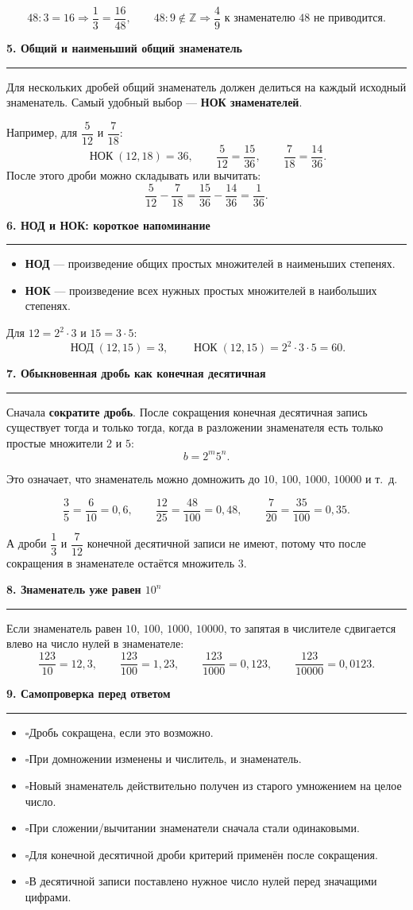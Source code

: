\documentclass[a4paper,12pt]{article}
\newcommand{\topic}[1]{%
  \vspace{0.55em}%
  {\large\bfseries\color{darkaccent}#1}\par
  \vspace{0.15em}\color{lightline}\rule{\linewidth}{0.6pt}\color{textgray}\vspace{0.25em}
}
\newcommand{\key}[1]{\textbf{\color{darkaccent}#1}}
\newcommand{\checkitem}{\(\square\)\;}
\newcommand{\nodop}{\mathop{\text{НОД}}\nolimits}
\newcommand{\nokop}{\mathop{\text{НОК}}\nolimits}
\begin{document}
\[
48:3=16 \Rightarrow \frac13=\frac{16}{48},
\qquad
48:9\notin\mathbb Z \Rightarrow \frac49\text{ к знаменателю }48\text{ не приводится}.
\]

\topic{5. Общий и наименьший общий знаменатель}
Для нескольких дробей общий знаменатель должен делиться на каждый исходный знаменатель. Самый удобный выбор --- \key{НОК знаменателей}.

Например, для \(\dfrac{5}{12}\) и \(\dfrac{7}{18}\):
\[
\nokop(12,18)=36,
\qquad
\frac{5}{12}=\frac{15}{36},
\qquad
\frac{7}{18}=\frac{14}{36}.
\]
После этого дроби можно складывать или вычитать:
\[
\frac{5}{12}-\frac{7}{18}=\frac{15}{36}-\frac{14}{36}=\frac1{36}.
\]

\topic{6. НОД и НОК: короткое напоминание}
\begin{itemize}
  \item \key{НОД} --- произведение общих простых множителей в наименьших степенях.
  \item \key{НОК} --- произведение всех нужных простых множителей в наибольших степенях.
\end{itemize}

Для \(12=2^2\cdot3\) и \(15=3\cdot5\):
\[
\nodop(12,15)=3,
\qquad
\nokop(12,15)=2^2\cdot3\cdot5=60.
\]

\topic{7. Обыкновенная дробь как конечная десятичная}
Сначала \key{сократите дробь}. После сокращения конечная десятичная запись существует тогда и только тогда, когда в разложении знаменателя есть только простые множители \(2\) и \(5\):
\[
b=2^m5^n.
\]

Это означает, что знаменатель можно домножить до \(10\), \(100\), \(1000\), \(10000\) и т.~д.

\[
\frac{3}{5}=\frac{6}{10}=0{,}6,
\qquad
\frac{12}{25}=\frac{48}{100}=0{,}48,
\qquad
\frac{7}{20}=\frac{35}{100}=0{,}35.
\]

А дроби \(\dfrac13\) и \(\dfrac7{12}\) конечной десятичной записи не имеют, потому что после сокращения в знаменателе остаётся множитель \(3\).

\topic{8. Знаменатель уже равен $10^n$}
Если знаменатель равен \(10\), \(100\), \(1000\), \(10000\), то запятая в числителе сдвигается влево на число нулей в знаменателе:
\[
\frac{123}{10}=12{,}3,\qquad
\frac{123}{100}=1{,}23,\qquad
\frac{123}{1000}=0{,}123,\qquad
\frac{123}{10000}=0{,}0123.
\]

\topic{9. Самопроверка перед ответом}
\begin{itemize}
  \item \checkitem Дробь сокращена, если это возможно.
  \item \checkitem При домножении изменены и числитель, и знаменатель.
  \item \checkitem Новый знаменатель действительно получен из старого умножением на целое число.
  \item \checkitem При сложении/вычитании знаменатели сначала стали одинаковыми.
  \item \checkitem Для конечной десятичной дроби критерий применён после сокращения.
  \item \checkitem В десятичной записи поставлено нужное число нулей перед значащими цифрами.
\end{itemize}
\end{document}
